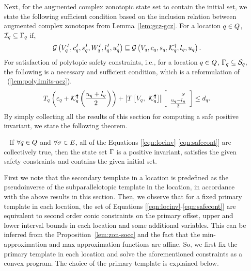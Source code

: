 %
Next, for the augmented complex zonotopic state set to contain the
initial set, we state the following sufficient condition based on the
inclusion relation between augmented complex zonotopes from
Lemma~\ref{lem:gcz-gcz}.
%
 For a location $q \in Q$, $\mathcal{I}_q\subseteq
  \Gamma_q$ if,
\begin{align}~\label{eqn:initcont}
\mathcal{G}\left(V^I_q,c^I_q,s^I_q,W^I_q,l^I_q,u^I_q\right)\sqsubseteq\mathcal{G}\left(V_q,c_q,s_q,\mathcal{K}^{\bm{\dagger}}_q,l_q,u_q\right).
\end{align}
%
For satisfaction of polytopic safety constraints, i.e., for a location
  $q\in Q$, $\Gamma_q\subseteq \mathcal{S}_q$, the
  following is a necessary and sufficient condition, which is a
  reformulation of
   ~(\ref{lem:polylimits-acz}). 
%
\begin{align}~\label{eqn:safecont}
T_q\left(c_q+\mathcal{K}^{\bm{\dagger}}_q\left(\frac{u_q+l_q}{2}\right)\right)+\left|T\left[V_q,~\mathcal{K}^{\bm{\dagger}}_q\right]\right|\left[\begin{array}{c}{\hspace{1.5em}s}\\{\frac{u_q-l_q}{2}} \end{array}\right]\leq d_q.
\end{align}
%
By simply collecting all the results of this section for computing a safe
positive invariant, we state the following theorem.
%
\begin{theorem}~\label{thm:main} If
  $\forall q\in Q$ and $\forall \sigma\in E$, all of
  the Equations [\ref{eqn:locinv}-\ref{eqn:safecont}] are collectively
  true, then the state set $\Gamma$ is a positive invariant,
  satisfies the given safety constraints and contains the given
  initial set.
\end{theorem}

  First we note that the secondary
template in a location is predefined as the pseudoinverse of the
subparallelotopic template in the location, in accordance with the
above results in this section.  Then, we observe that for a fixed
primary template in each location, the set of
Equations [\ref{eqn:locinv}-\ref{eqn:safecont}] are equivalent to
second order conic constraints on the primary offset, upper and lower
interval bounds in each location and some additional variables.  This
can be inferred from the Proposition~\ref{lem:zon-socc} and the fact
that the min-approximation and max approximation functions are affine. So, we first fix the primary template in each
location and solve the aforementioned constraints as a convex program.
The choice of the primary template is explained below.

